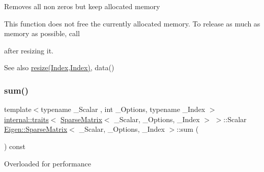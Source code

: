 Removes all non zeros but keep allocated memory

This function does not free the currently allocated memory. To release as much as memory as possible, call
\begin{DoxyCode}{0}
\end{DoxyCode}
 after resizing it.

\begin{DoxySeeAlso}{See also}
\mbox{\hyperlink{class_eigen_1_1_sparse_matrix_af88551f30202341b7cc24cfadabdec5c}{resize(\+Index,\+Index)}}, data() 
\end{DoxySeeAlso}
\mbox{\label{class_eigen_1_1_sparse_matrix_a0700cd0b8658962d742fa51a5e594a2f}} 
\subsubsection{\texorpdfstring{sum()}{sum()}}
{\footnotesize\ttfamily template$<$typename \+\_\+\+Scalar , int \+\_\+\+Options, typename \+\_\+\+Index $>$ \\
\mbox{\hyperlink{struct_eigen_1_1internal_1_1traits}{internal\+::traits}}$<$ \mbox{\hyperlink{class_eigen_1_1_sparse_matrix}{Sparse\+Matrix}}$<$ \+\_\+\+Scalar, \+\_\+\+Options, \+\_\+\+Index $>$ $>$\+::Scalar \mbox{\hyperlink{class_eigen_1_1_sparse_matrix}{Eigen\+::\+Sparse\+Matrix}}$<$ \+\_\+\+Scalar, \+\_\+\+Options, \+\_\+\+Index $>$\+::sum (\begin{DoxyParamCaption}{ }\end{DoxyParamCaption}) const}

Overloaded for performance \mbox{\label{class_eigen_1_1_sparse_matrix_ae9b9ad3524f87276511397d988b7a607}} 
